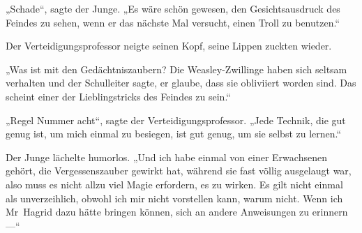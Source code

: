 „Schade“, sagte der Junge.
„Es wäre schön gewesen, den Gesichtsausdruck des Feindes zu sehen, wenn er das nächste Mal versucht, einen Troll zu benutzen.“

Der Verteidigungsprofessor neigte seinen Kopf, seine Lippen zuckten wieder.

„Was ist mit den Gedächtniszaubern? Die Weasley-Zwillinge haben sich seltsam verhalten und der Schulleiter sagte, er glaube, dass sie obliviiert worden sind. Das scheint einer der Lieblingstricks des Feindes zu sein.“

„Regel Nummer acht“, sagte der Verteidigungsprofessor.
„Jede Technik, die gut genug ist, um mich einmal zu besiegen, ist gut genug, um sie selbst zu lernen.“

Der Junge lächelte humorlos.
„Und ich habe einmal von einer Erwachsenen gehört, die Vergessenszauber gewirkt hat, während sie fast völlig ausgelaugt war, also muss es nicht allzu viel Magie erfordern, es zu wirken. Es gilt nicht einmal als unverzeihlich, obwohl ich mir nicht vorstellen kann, warum nicht. Wenn ich Mr~Hagrid dazu hätte bringen können, sich an andere Anweisungen zu erinnern —“

